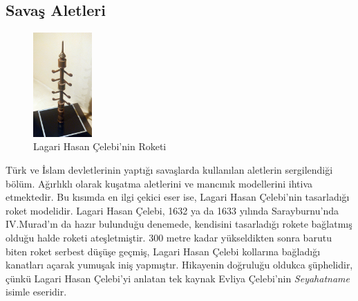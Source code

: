 \subsection{Savaş Aletleri}
\begin{figure}
    \centering
    \includegraphics[width=0.2\textwidth]{assets/lageri.jpg}
    \caption{Lagari Hasan Çelebi'nin Roketi}
\end{figure}
\indent\indent Türk ve İslam devletlerinin yaptığı savaşlarda kullanılan aletlerin sergilendiği bölüm. Ağırlıklı olarak kuşatma aletlerini ve mancınık modellerini ihtiva etmektedir. Bu kısımda en ilgi çekici eser ise, Lagari Hasan Çelebi'nin tasarladığı roket modelidir. Lagari Hasan Çelebi, 1632 ya da 1633 yılında Sarayburnu'nda IV.Murad'ın da hazır bulunduğu denemede, kendisini tasarladığı rokete bağlatmış olduğu halde roketi ateşletmiştir. 300 metre kadar yükseldikten sonra barutu biten roket serbest düşüşe geçmiş, Lagari Hasan Çelebi kollarına bağladığı kanatları açarak yumuşak iniş yapmıştır. Hikayenin doğruluğu oldukca şüphelidir, çünkü Lagari Hasan Çelebi'yi anlatan tek kaynak Evliya Çelebi'nin \textit{Seyahatname} isimle eseridir.\newline
